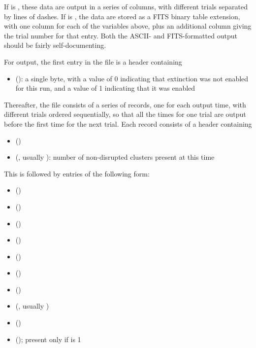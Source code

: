 \documentclass[letterpaper,10pt,english]{sphinxmanual}
\begin{document}
If  is , these data are output in a series of columns, with different trials separated by lines of dashes. If  is , the data are stored as a FITS binary table extension, with one column for each of the variables above, plus an additional column giving the trial number for that entry. Both the ASCII- and FITS-formatted output should be fairly self-documenting.

For  output, the first entry in the file is a header containing
\begin{itemize}
\item {} 
 (): a single byte, with a value of 0 indicating that extinction was not enabled for this run, and a value of 1 indicating that it was enabled

\end{itemize}

Thereafter, the file consists of a series of records, one for each output time, with different trials ordered sequentially, so that all the times for one trial are output before the first time for the next trial. Each record consists of a header containing
\begin{itemize}
\item {} 
 ()

\item {} 
 (, usually ): number of non-disrupted clusters present at this time

\end{itemize}

This is followed by  entries of the following form:
\begin{itemize}
\item {} 
 ()

\item {} 
 ()

\item {} 
 ()

\item {} 
 ()

\item {} 
 ()

\item {} 
 ()

\item {} 
 ()

\item {} 
 (, usually )

\item {} 
 ()

\item {} 
 (); present only if  is 1

\end{itemize}
\end{document}

